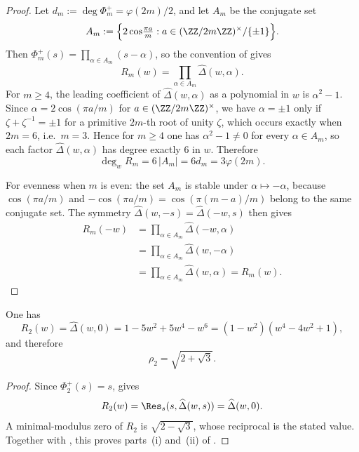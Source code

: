 \begin{proof}

Let \(d_m:=\deg\Phi_m^+=\varphi(2m)/2\), and let \(A_m\) be the
conjugate set
\[
  A_m:=\Bigl\{2\cos\!\tfrac{\pi a}{m}:a\in(\ZZ/2m\ZZ)^\times/\{\pm 1\}\Bigr\}.
\]
Then \(\Phi_m^+(s)=\prod_{\alpha\in A_m}(s-\alpha)\), so the convention
of  gives
\[
  R_m(w)
  =
    \prod_{\alpha\in A_m}\widehat\Delta(w,\alpha).
\]
For \(m\ge 4\), the leading coefficient of \(\widehat\Delta(w,\alpha)\)
as a polynomial in \(w\) is \(\alpha^2-1\). Since \(\alpha=2\cos(\pi a/m)\)
for \(a\in(\ZZ/2m\ZZ)^\times\), we have \(\alpha=\pm 1\) only if
\(\zeta+\zeta^{-1}=\pm 1\) for a primitive \(2m\)-th root of unity
\(\zeta\), which occurs exactly when \(2m=6\), i.e.\ \(m=3\). Hence
for \(m\ge 4\) one has \(\alpha^2-1\neq 0\) for every \(\alpha\in A_m\),
so each factor \(\widehat\Delta(w,\alpha)\) has degree exactly \(6\) in
\(w\). Therefore
\[
  \deg_w R_m=6\,|A_m|=6d_m=3\varphi(2m).
\]

For evenness when \(m\) is even: the set \(A_m\) is stable under
\(\alpha\mapsto-\alpha\), because \(\cos(\pi a/m)\) and
\(-\cos(\pi a/m)=\cos(\pi(m-a)/m)\) belong to the same conjugate set.
The symmetry \(\widehat\Delta(w,-s)=\widehat\Delta(-w,s)\) then gives
\[
\begin{aligned}
  R_m(-w)
  &=
    \prod_{\alpha\in A_m}\widehat\Delta(-w,\alpha) \\
  &=
    \prod_{\alpha\in A_m}\widehat\Delta(w,-\alpha) \\
  &=
    \prod_{\alpha\in A_m}\widehat\Delta(w,\alpha)
    =R_m(w).
\end{aligned}
\]

\end{proof}

\begin{corollary}[The twist \(m=2\)]
  \label{cor:rho-m2-closed-form}
  One has
\[
    R_2(w)=\widehat\Delta(w,0)
    =1-5w^2+5w^4-w^6
    =(1-w^2)(w^4-4w^2+1),
\]
  and therefore
\[
    \rho_2=\sqrt{2+\sqrt3}.
\]
\end{corollary}

\begin{proof}
Since \(\Phi_2^+(s)=s\),  gives
\[
  R_2(w)=\Res_s(s,\widehat\Delta(w,s))=\widehat\Delta(w,0).
\]
A minimal-modulus zero of \(R_2\) is \(\sqrt{2-\sqrt3}\), whose
reciprocal is the stated value. Together with
, this proves
parts~\textup{(i)} and~\textup{(ii)} of
.
\end{proof}

